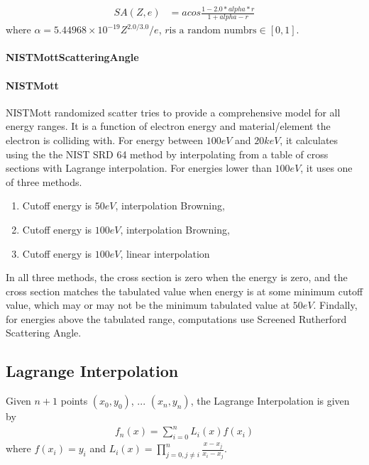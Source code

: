 \begin{align*}
    SA(Z, e) &= acos\frac{1 - 2.0 * alpha * r}{1 + alpha - r}
\end{align*}
where $\alpha = 5.44968\times 10^{-19} Z^{2.0 / 3.0} / e$, $r \text{is a random numbrs} \in [0, 1]$.

\subsubsection{NISTMottScatteringAngle}
\subsubsection{NISTMott}
NISTMott randomized scatter tries to provide a comprehensive model for all energy ranges. It is a function of electron energy and material/element the electron is colliding with. For energy between $100eV$ and $20keV$, it calculates using the the NIST SRD 64 method by interpolating from a table of cross sections with Lagrange interpolation. For energies lower than $100eV$, it uses one of three methods. 
\begin{enumerate}
\item Cutoff energy is $50 eV$, interpolation Browning,
\item Cutoff energy is $100 eV$, interpolation Browning,
\item Cutoff energy is $100 eV$, linear interpolation
\end{enumerate}
In all three methods, the cross section is zero when the energy is zero, and the cross section matches the tabulated value when energy is at some minimum cutoff value, which may or may not be the minimum tabulated value at $50eV$. Findally, for energies above the tabulated range, computations use Screened Rutherford Scattering Angle.

\begin{appendices}
\chapter{Lagrange Interpolation}
Given $n+1$ points $(x_0, y_0)$, ... $(x_n, y_n)$, the Lagrange Interpolation is given by 
\begin{align*}
    f_n(x) = \sum^{n}_{i=0} L_i(x)f(x_i)
\end{align*}
where $f(x_i) = y_i$ and $L_i(x)=\prod_{j=0,j\ne i}^{n}\frac{x-x_j}{x_i-x_j}$.
\end{appendices}

